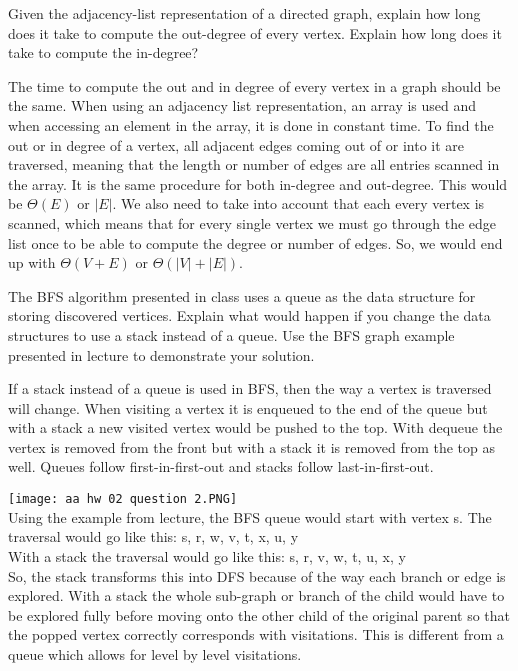 \documentclass[addpoints,11pt]{exam}
\begin{document}
\begin{questions}


\question[10] Given the adjacency-list representation of a directed graph, explain how long does it take to compute the out-degree of every vertex.  Explain how long does it take to compute the in-degree?
\begin{solutionorbox}
The time to compute the out and in degree of every vertex in a graph should be the same. When using an adjacency list representation, an array is used and when accessing an element in the array, it is done in constant time. To find the out or in degree of a vertex, all adjacent edges coming out of or into it are traversed, meaning that the length or number of edges are all entries scanned in the array. It is the same procedure for both in-degree and out-degree. This would be $\Theta(E)$ or $|E|$. We also need to take into account that each every vertex is scanned, which means that for every single vertex we must go through the edge list once to be able to compute the degree or number of edges. So, we would end up with $\Theta(V+E)$ or $\Theta(|V|+|E|)$. 
\end{solutionorbox}

\newpage


\question[10]
The BFS algorithm presented in class uses a queue as the data structure for storing discovered vertices.  Explain what would happen if you change the data structures to use a stack instead of a queue.  Use the BFS graph example presented in lecture to demonstrate your solution.   
\begin{solutionorbox}
If a stack instead of a queue is used in BFS, then the way a vertex is traversed will change. When visiting a vertex it is enqueued to the end of the queue but with a stack a new visited vertex would be pushed to the top. With dequeue the vertex is removed from the front but with a stack it is removed from the top as well. Queues follow first-in-first-out and stacks follow last-in-first-out. 

\texttt{[image: aa hw 02 question 2.PNG]}
\\Using the example from lecture, the BFS queue would start with vertex s. The traversal would go like this: s, r, w, v, t, x, u, y 
\\With a stack the traversal would go like this: s, r, v, w, t, u, x, y
\\So, the stack transforms this into DFS because of the way each branch or edge is explored. With a stack the whole sub-graph or branch of the child would have to be explored fully before moving onto the other child of the original parent so that the popped vertex correctly corresponds with visitations. This is different from a queue which allows for level by level visitations. 
\end{solutionorbox}


\end{questions}
\end{document}

